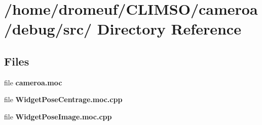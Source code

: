 \section{/home/dromeuf/CLIMSO/cameroa/debug/src/ Directory Reference}
\label{dir_8bf24df279917a23e1f8aa9236543396}
\subsection*{Files}
\begin{CompactItemize}
\item 
file {\bf cameroa.moc}
\item 
file {\bf Widget\-Pose\-Centrage.moc.cpp}
\item 
file {\bf Widget\-Pose\-Image.moc.cpp}
\end{CompactItemize}
